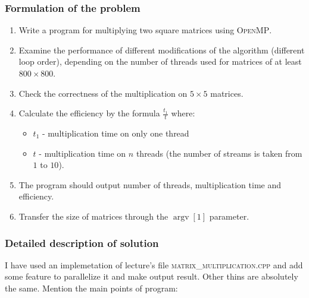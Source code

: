 \documentclass[%
12pt, %
final, %
oneside, %
onecolumn, %
centertags]{article} %
\theoremstyle{plain}
\theoremstyle{definition}
\theoremstyle{remark}
\begin{document}
\subsubsection{Formulation of the problem}

\begin{enumerate}
	\item Write a program for multiplying two square matrices using \textsc{OpenMP}. 
	\item Examine the performance of different modifications of the algorithm (different loop order), depending on the number of threads used for matrices of at least $800 \times 800$.
	\item Check the correctness of the multiplication on $5 \times 5$ matrices.
	\item Calculate the efficiency by the formula $\frac{t_1}{t}$ where:
	\begin{itemize}
		\item $t_1$ - multiplication time on only one thread
		\item $t$ - multiplication time on $n$ threads (the number of streams is taken from $1$ to $10$).
	\end{itemize}
	\item The program should output number of threads, multiplication time and efficiency.
	\item Transfer the size of matrices through the $\operatorname{argv} [1]$ parameter.
\end{enumerate}

\subsubsection{Detailed description of solution}

I have used an implemetation of lecture's file \textsc{matrix\_multiplication.cpp} and add some feature to parallelize it and make output result. Other thins are absolutely the same. Mention the main points of program:
\end{document}
